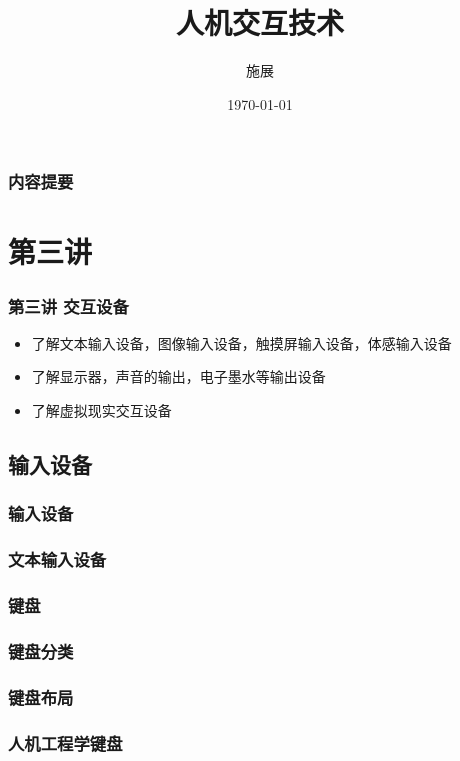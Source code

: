 \documentclass{beamer}
\title{人机交互技术}
\author{施展}
\institute{华中科技大学~武汉光电国家实验室}
\date{\today}
\begin{document}
\begin{frame}
	\titlepage
\end{frame}

\begin{frame}
	\frametitle{内容提要}
	\tableofcontents
\end{frame}

\section{第三讲}
\begin{frame}
	\frametitle{第三讲 交互设备}
	\begin{itemize}
		\item 了解文本输入设备，图像输入设备，触摸屏输入设备，体感输入设备
		\item 了解显示器，声音的输出，电子墨水等输出设备
		\item 了解虚拟现实交互设备
	\end{itemize}
\end{frame}

\subsection{输入设备}
\begin{frame}
	\frametitle{输入设备}

\end{frame}

\begin{frame}
	\frametitle{文本输入设备}

\end{frame}

\begin{frame}
	\frametitle{键盘}

\end{frame}

\begin{frame}
	\frametitle{键盘分类}

\end{frame}

\begin{frame}
	\frametitle{键盘布局}

\end{frame}

\begin{frame}
	\frametitle{人机工程学键盘}

\end{frame}
\end{document}
